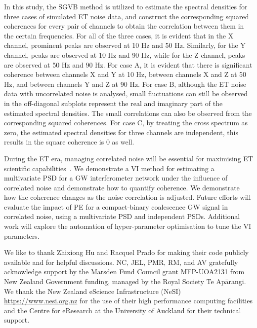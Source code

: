 \documentclass[%
 reprint,
 amsmath,amssymb,
 aps,
 nofootinbib,
]{revtex4-2}
\begin{document}
In this study, the \ac{SGVB} method is utilized to estimate the spectral densities for three cases of simulated ET noise data, and construct the corresponding squared coherences for every pair of channels to obtain the correlation between them in the certain frequencies. For all of the three cases, it is evident that in the X channel, prominent peaks are observed at 10 Hz and 50 Hz. Similarly, for the Y channel, peaks are observed at 10 Hz and 90 Hz, while for the Z channel, peaks are observed at 50 Hz and 90 Hz. For case A, it is evident that there is significant coherence between channels X and Y at 10 Hz, between channels X and Z at 50 Hz, and between channels Y and Z at 90 Hz. For case B, although the ET noise data with uncorrelated noise is analysed, small fluctuations can still be observed in the off-diagonal subplots represent the real and imaginary part of the estimated spectral densities. The small correlations can also be observed from the  corresponding squared coherences. For case C, by treating the cross spectrum as zero, the estimated spectral densities for three channels are independent, this results in the square coherence is 0 as well.





During the \ac{ET} era, managing correlated noise will be essential for maximising \ac{ET} scientific capabilities~\cite{Cireddu:2023:arXiv}.
We demonstrate a VI method for estimating a multivariate PSD for a \ac{GW} interferometer network under the influence of correlated noise and demonstrate how to quantify coherence. 
We demonstrate how the coherence changes as the noise correlation is adjusted. 
Future efforts will evaluate the impact of \ac{PE} for a compact-binary coalescence \ac{GW} signal in correlated noise, using a multivariate PSD and independent PSDs. 
Additional work will explore the automation of hyper-parameter optimisation to tune the \ac{VI} parameters. 


\begin{acknowledgments}
We like to thank Zhixiong Hu and Racquel Prado for making their code publicly available and for helpful discussions. NC, JEL, PMR, RM, and AV gratefully acknowledge support  by the Marsden Fund Council grant MFP-UOA2131 from New Zealand Government funding, managed by the Royal Society Te Apārangi. We thank the New Zealand eScience Infrastructure
(NeSI) \url{https://www.nesi.org.nz} for the use of their high performance computing facilities and
the Centre for eResearch at the University of Auckland for their technical
support.
\end{acknowledgments}

\end{document}
